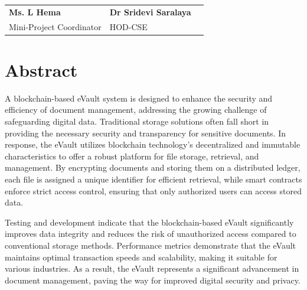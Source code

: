 \documentclass[12pt,a4paper]{report}
\begin{document}
\vspace{0.55in}
\par
\vspace{0.65in}

\begin{tabularx}{0.95 \textwidth} { 
   >{\raggedright\arraybackslash}X 
   >{\centering\arraybackslash}X 
   >{\raggedleft\arraybackslash}X  }
     \textbf{Ms. L Hema} &  \textbf{Dr Sridevi Saralaya}\\
     Mini-Project Coordinator &   HOD-CSE \\
\end{tabularx}





\pagestyle{plain}
\chapter*{Abstract}

A blockchain-based eVault system is designed to enhance the 
security and efficiency of document management, addressing 
the growing challenge of safeguarding digital data. Traditional 
storage solutions often fall short in providing the necessary 
security and transparency for sensitive documents. In response, 
the eVault utilizes blockchain technology's decentralized and 
immutable characteristics to offer a robust platform for file 
storage, retrieval, and management. By encrypting documents and 
storing them on a distributed ledger, each file is assigned a 
unique identifier for efficient retrieval, while smart contracts 
enforce strict access control, ensuring that only authorized 
users can access stored data.

Testing and development indicate that the blockchain-based eVault 
significantly improves data integrity and reduces the risk of 
unauthorized access compared to conventional storage methods. 
Performance metrics demonstrate that the eVault maintains optimal 
transaction speeds and scalability, making it suitable for various 
industries. As a result, the eVault represents a significant 
advancement in document management, paving the way for improved 
digital security and privacy.

\renewcommand{\contentsname}{Table of Contents}
\tableofcontents
{}
\listoffigures
{}
\newpage
\end{document}
